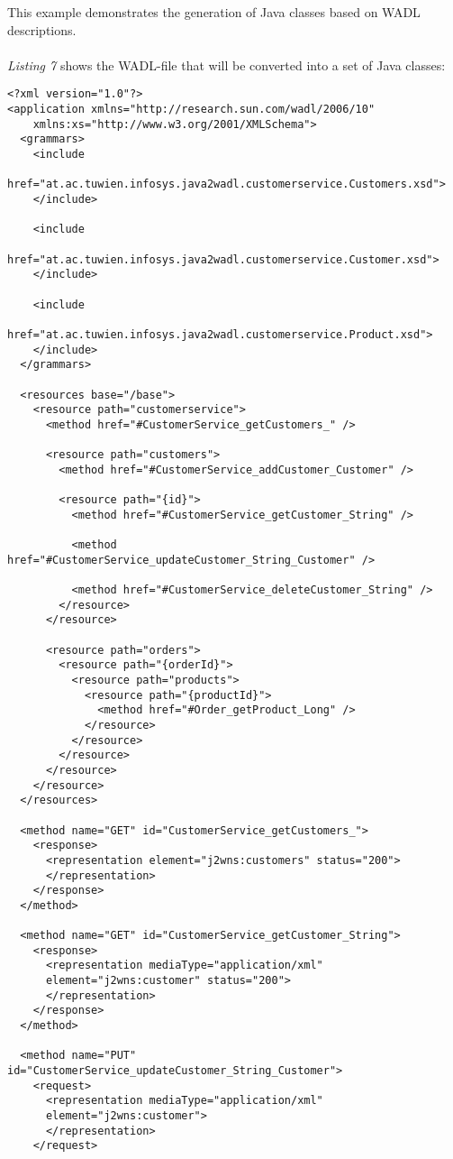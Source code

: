 This example demonstrates the generation of Java classes based on WADL descriptions.
\\ \\
\emph{Listing 7} shows the WADL-file that will be converted into a set of Java classes:
\begin{lstlisting}
<?xml version="1.0"?>
<application xmlns="http://research.sun.com/wadl/2006/10"
	xmlns:xs="http://www.w3.org/2001/XMLSchema">
  <grammars>
    <include 
    	href="at.ac.tuwien.infosys.java2wadl.customerservice.Customers.xsd">
    </include>

    <include
    	href="at.ac.tuwien.infosys.java2wadl.customerservice.Customer.xsd">
    </include>

    <include
	    href="at.ac.tuwien.infosys.java2wadl.customerservice.Product.xsd">
    </include>
  </grammars>

  <resources base="/base">
    <resource path="customerservice">
      <method href="#CustomerService_getCustomers_" />

      <resource path="customers">
        <method href="#CustomerService_addCustomer_Customer" />

        <resource path="{id}">
          <method href="#CustomerService_getCustomer_String" />

          <method href="#CustomerService_updateCustomer_String_Customer" />

          <method href="#CustomerService_deleteCustomer_String" />
        </resource>
      </resource>

      <resource path="orders">
        <resource path="{orderId}">
          <resource path="products">
            <resource path="{productId}">
              <method href="#Order_getProduct_Long" />
            </resource>
          </resource>
        </resource>
      </resource>
    </resource>
  </resources>

  <method name="GET" id="CustomerService_getCustomers_">
    <response>
      <representation element="j2wns:customers" status="200">
      </representation>
    </response>
  </method>

  <method name="GET" id="CustomerService_getCustomer_String">
    <response>
      <representation mediaType="application/xml"
      element="j2wns:customer" status="200">
      </representation>
    </response>
  </method>

  <method name="PUT" id="CustomerService_updateCustomer_String_Customer">
    <request>
      <representation mediaType="application/xml"
      element="j2wns:customer">
      </representation>
    </request>


\end{lstlisting}
